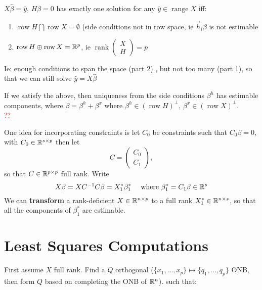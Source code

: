 \documentclass{article}
\newcommand\myworries[1]{\textcolor{red}{#1}}
\newcommand{\rank}{\operatorname{rank}}
\newcommand{\range}{\operatorname{range}}
\newcommand{\row}{\operatorname{row}}
\begin{document}
    \begin{theorem}
        $X\hat \beta = \hat y$, $H\beta = 0 $ has exactly one solution for any $\hat y\in \range X$ iff: 
        \begin{enumerate}
            \item $\row H \bigcap \row X = \emptyset $ (side conditions not in row space, ie $\vec h_i \beta$ is not estimable 
            \item $\row H \oplus \row X = \R^p$, ie $\rank \begin{pmatrix}
                X\\
                H
            \end{pmatrix} = p$
        \end{enumerate}
        Ie: enough conditions to span the space (part 2) , but not too many (part 1), so that we can still solve $\hat y = X\hat \beta $
    \end{theorem}

    \begin{corollary}
        If we satisfy the above, then uniqueness from the side conditions $\beta^h$ has estimable components, where $\beta = \beta^h + \beta^x$ where $\beta^h \in (\row H)^\perp   $, $\beta^x \in (\row X)^
\perp $.\\
\myworries{??}
    \end{corollary}
    One idea for incorporating constraints is let $C_0$ be constraints such that $C_0 \beta = 0$, with $C_0 \in \mathbb R^{s\times p} $ then let 
    $$C = \begin{pmatrix}
        C_0\\
        C_1
    \end{pmatrix},$$
    so that $C\in \mathbb R^{p\times p}$ full rank.
    Write
    $$X\beta = XC^{-1} C \beta = X_1^* \beta_1^* \quad \text { where } \beta_1^* = C_1 \beta\in \mathbb R^s $$
    We can \textbf{transform} a rank-deficient $X\in \mathbb R^{n\times p}$ to a full rank $X_1^* \in \mathbb R^{n\times s}$, so that all the components of $\beta_1^*$ are estimable.

\section{Least Squares Computations}
First assume $X$ full rank. Find a $Q$ orthogonal ($\{x_1,\ldots, x_p\} \mapsto \{q_1,\ldots, q_p\}$ ONB, then form $Q$ based on completing the ONB of $\mathbb R^n$).  such that:
\end{document}
